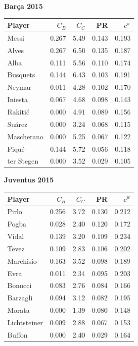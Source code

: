 \begin{table}[p]
\vspace{10pt}

\begin{minipage}[t]{0.48\textwidth}\centering\footnotesize
\textbf{Barça 2015}\\[2pt]
\begin{tabular}{lrrrr}
\toprule
Player & $C_B$ & $C_C$ & PR & $c^w$ \\
\midrule
Messi & 0.267 & 5.49 & 0.143 & 0.193 \\
Alves & 0.267 & 6.50 & 0.135 & 0.187 \\
Alba & 0.111 & 5.56 & 0.110 & 0.174 \\
Busquets & 0.144 & 6.43 & 0.103 & 0.191 \\
Neymar & 0.011 & 4.28 & 0.102 & 0.170 \\
Iniesta & 0.067 & 4.68 & 0.098 & 0.143 \\
Rakitić & 0.000 & 4.91 & 0.089 & 0.156 \\
Suárez & 0.000 & 3.24 & 0.068 & 0.115 \\
Mascherano & 0.000 & 5.25 & 0.067 & 0.122 \\
Piqué & 0.144 & 5.72 & 0.056 & 0.118 \\
ter Stegen & 0.000 & 3.52 & 0.029 & 0.105 \\
\bottomrule
\end{tabular}
\end{minipage}\hfill
\begin{minipage}[t]{0.48\textwidth}\centering\footnotesize
\textbf{Juventus 2015}\\[2pt]
\begin{tabular}{lrrrr}
\toprule
Player & $C_B$ & $C_C$ & PR & $c^w$ \\
\midrule
Pirlo & 0.256 & 3.72 & 0.130 & 0.212 \\
Pogba & 0.028 & 2.40 & 0.120 & 0.172 \\
Vidal & 0.139 & 3.20 & 0.109 & 0.234 \\
Tevez & 0.109 & 2.83 & 0.106 & 0.202 \\
Marchisio & 0.163 & 3.52 & 0.098 & 0.189 \\
Evra & 0.011 & 2.34 & 0.095 & 0.203 \\
Bonucci & 0.083 & 2.76 & 0.084 & 0.166 \\
Barzagli & 0.094 & 3.12 & 0.082 & 0.195 \\
Morata & 0.000 & 1.39 & 0.080 & 0.148 \\
Lichtsteiner & 0.009 & 2.88 & 0.067 & 0.153 \\
Buffon & 0.000 & 2.40 & 0.029 & 0.164 \\
\bottomrule
\end{tabular}
\end{minipage}
\end{table}
